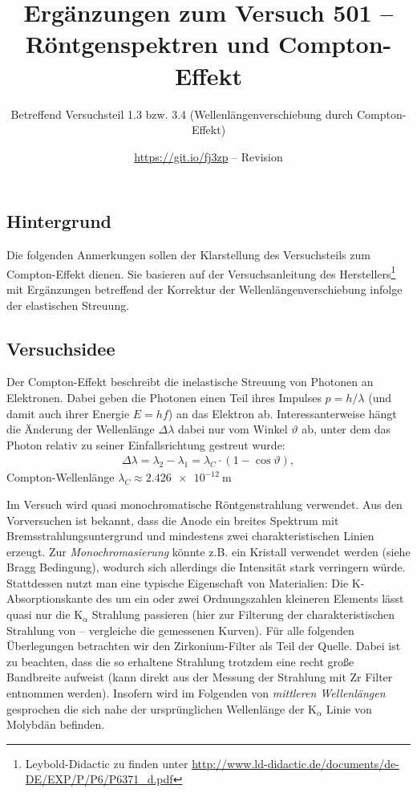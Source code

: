 \documentclass[ngerman,a4paper,twocolumn,twoside]{scrartcl}
\title{Ergänzungen zum Versuch 501 -- Röntgenspektren und Compton-Effekt}
\subtitle{Betreffend Versuchsteil 1.3 bzw. 3.4 (Wellenlängenverschiebung durch Compton-Effekt)}
\author{\url{https://git.io/fj3zp} -- Revision \texttt{}}
\begin{document}
\maketitle
\subsection*{Hintergrund}
Die folgenden Anmerkungen sollen der Klarstellung des Versuchsteils zum Compton-Effekt dienen. Sie basieren auf der Versuchsanleitung des Herstellers\footnote{Leybold-Didactic zu finden unter \url{http://www.ld-didactic.de/documents/de-DE/EXP/P/P6/P6371_d.pdf}} mit Ergänzungen betreffend der Korrektur der Wellenlängenverschiebung infolge der elastischen Streuung.
\subsection*{Versuchsidee}
Der Compton-Effekt beschreibt die inelastische Streuung von Photonen an Elektronen. Dabei geben die Photonen einen Teil ihres Impulses $p=h/\lambda$ (und damit auch ihrer Energie $E=hf$) an das Elektron ab. Interessanterweise hängt die Änderung der Wellenlänge $\Delta\lambda$ dabei nur vom Winkel $\vartheta$ ab, unter dem das Photon relativ zu seiner Einfallsrichtung gestreut wurde:
\begin{align}
\Delta\lambda=\lambda_2-\lambda_1=\lambda_C \cdot (1-\cos\vartheta), \label{eq:compton}
\end{align}
Compton-Wellenlänge $\lambda_C\approx\SI{2.426e-12}{\m}$
\par
Im Versuch wird quasi monochromatische Röntgenstrahlung verwendet. Aus den Vorversuchen ist bekannt, dass die Anode ein breites Spektrum mit Bremsstrahlungsuntergrund und mindestens zwei charakteristischen Linien erzeugt. Zur \emph{Monochromasierung} könnte z.B. ein Kristall verwendet werden (siehe Bragg Bedingung), wodurch sich allerdings die Intensität stark verringern würde. Stattdessen nutzt man eine typische Eigenschaft von Materialien: Die K-Absorptionskante des um ein oder zwei Ordnungszahlen kleineren Elements lässt quasi nur die $\mathrm{K}_\alpha$ Strahlung passieren (hier  zur Filterung der charakteristischen Strahlung von   -- vergleiche die gemessenen Kurven). Für alle folgenden Überlegungen betrachten wir den Zirkonium-Filter als Teil der Quelle. Dabei ist zu beachten, dass die so erhaltene Strahlung trotzdem eine recht große Bandbreite aufweist (kann direkt aus der Messung der Strahlung mit Zr Filter entnommen werden). Insofern wird im Folgenden von \emph{mittleren Wellenlängen} gesprochen die sich nahe der ursprünglichen Wellenlänge der $\mathrm{K}_\alpha$ Linie von Molybdän befinden.
\end{document}
